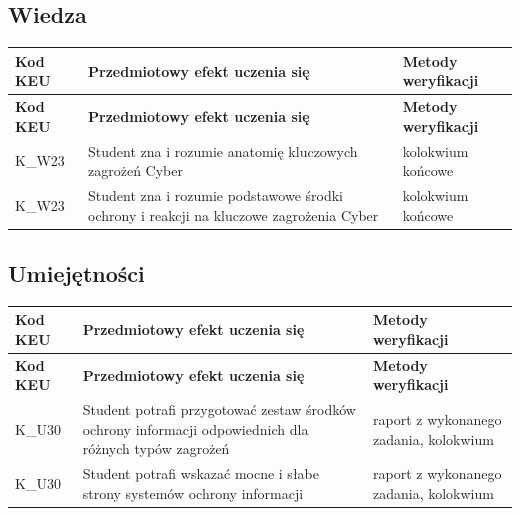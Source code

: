 \documentclass[12pt, a4paper]{article}
\newcommand{\thdrule}{\noalign{\global\setlength{\extrarowheight}{0pt}}}
\newcommand{\thdend}{\noalign{\global\setlength{\extrarowheight}{3pt}}}
\begin{document}
\subsection*{Wiedza}
{\scriptsize
\begin{longtable}{m{1.6cm}m{9.0cm}m{4.2cm}}
\thdrule\toprule
\rowcolor{pjatkRed} {\color{white}\footnotesize\textbf{\vphantom{Ag}Kod KEU}} & {\color{white}\footnotesize\textbf{\vphantom{Ag}Przedmiotowy efekt uczenia się}} & {\color{white}\footnotesize\textbf{\vphantom{Ag}Metody weryfikacji}} \\
\midrule\thdend
\endfirsthead
\thdrule\toprule
\rowcolor{pjatkRed} {\color{white}\footnotesize\textbf{\vphantom{Ag}Kod KEU}} & {\color{white}\footnotesize\textbf{\vphantom{Ag}Przedmiotowy efekt uczenia się}} & {\color{white}\footnotesize\textbf{\vphantom{Ag}Metody weryfikacji}} \\
\midrule\thdend
\endhead
  \rowcolor{tableRowLight} K\_W23 & Student zna i rozumie anatomię kluczowych zagrożeń Cyber & kolokwium końcowe \\
  \rowcolor{tableRowAlt} K\_W23 & Student zna i rozumie podstawowe środki ochrony i reakcji na kluczowe zagrożenia Cyber & kolokwium końcowe \\
\bottomrule
\end{longtable}}

\subsection*{Umiejętności}
{\scriptsize
\begin{longtable}{m{1.6cm}m{9.0cm}m{4.2cm}}
\thdrule\toprule
\rowcolor{pjatkRed} {\color{white}\footnotesize\textbf{\vphantom{Ag}Kod KEU}} & {\color{white}\footnotesize\textbf{\vphantom{Ag}Przedmiotowy efekt uczenia się}} & {\color{white}\footnotesize\textbf{\vphantom{Ag}Metody weryfikacji}} \\
\midrule\thdend
\endfirsthead
\thdrule\toprule
\rowcolor{pjatkRed} {\color{white}\footnotesize\textbf{\vphantom{Ag}Kod KEU}} & {\color{white}\footnotesize\textbf{\vphantom{Ag}Przedmiotowy efekt uczenia się}} & {\color{white}\footnotesize\textbf{\vphantom{Ag}Metody weryfikacji}} \\
\midrule\thdend
\endhead
  \rowcolor{tableRowLight} K\_U30 & Student potrafi przygotować zestaw środków ochrony informacji odpowiednich dla różnych typów zagrożeń & raport z wykonanego zadania, kolokwium \\
  \rowcolor{tableRowAlt} K\_U30 & Student potrafi wskazać mocne i słabe strony systemów ochrony informacji & raport z wykonanego zadania, kolokwium \\
\bottomrule
\end{longtable}}
\end{document}
